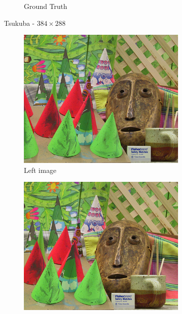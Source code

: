 \begin{figure}[ht]
\begin{subfigure}[t]{0.3\textwidth}
    \caption{Ground Truth\label{fig:aptsu_gt}}
  \end{subfigure}
  \caption{Tsukuba - $384\times288$ \cite{Scharstein2002}\label{fig:aptsu}}
\end{figure}

\begin{figure}[ht]
  \centering
  \begin{subfigure}[t]{0.3\textwidth}
    \centering\includegraphics[width=0.9\textwidth]{figures/conl.jpg}
    \caption{Left image \label{fig:apcon_l}}
  \end{subfigure}\hspace{0.5cm}
  \begin{subfigure}[t]{0.3\textwidth}
    \centering\includegraphics[width=0.9\textwidth]{figures/conr}

\end{subfigure}
\end{figure}
